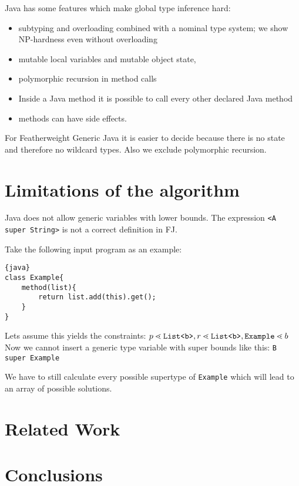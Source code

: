 \documentclass[a4paper,USenglish,cleveref, autoref, thm-restate]{lipics-v2021}
\begin{document}
Java has some features which make global type inference hard:
\begin{itemize}
\item subtyping and overloading combined with a nominal type system;
  we show NP-hardness even without overloading
\item mutable local variables and mutable object state,
\item polymorphic recursion in method calls
\item Inside a Java method it is possible to call every other declared Java method
\item methods can have side effects.
\end{itemize}


For Featherweight Generic Java it is easier to decide because there is no state and therefore no wildcard types.
Also we exclude polymorphic recursion.


\section{Limitations of the algorithm}
\label{sec:limits-algorithm}

Java does not allow generic variables with lower bounds.
The expression \texttt{<A super String>} is not a correct definition in FJ.

Take the following input program as an example:
\begin{lstlisting}{java}
class Example{
    method(list){
        return list.add(this).get();
    }
}
\end{lstlisting}
Lets assume this yields the constraints:
$p \lessdot \mathtt{List \texttt{<} b \texttt{>} }, r \lessdot \mathtt{List \texttt{<} b \texttt{>} }, \texttt{Example} \lessdot b$
Now we cannot insert a generic type variable with super bounds like this:
\texttt{B super Example}

We have to still calculate every possible supertype of \texttt{Example} which will lead to an array of possible solutions.


\section{Related Work}
\label{sec:related-work}



\section{Conclusions}
\label{sec:conclusions}


%

\end{document}
